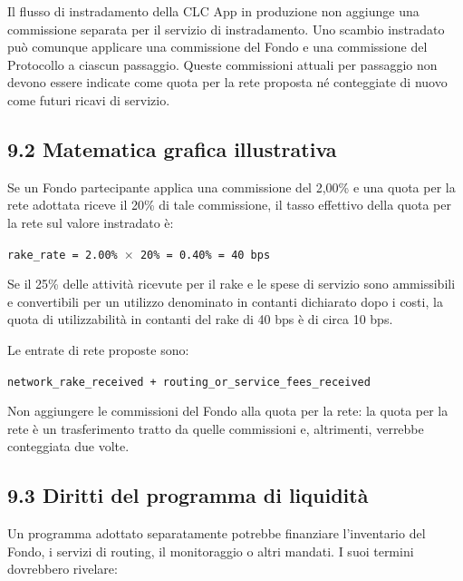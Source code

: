 \documentclass[11pt]{article}
\begin{document}
Il flusso di instradamento della CLC App in produzione non aggiunge una commissione separata per il servizio di instradamento. Uno scambio instradato può comunque applicare una commissione del Fondo e una commissione del Protocollo a ciascun passaggio. Queste commissioni attuali per passaggio non devono essere indicate come quota per la rete proposta né conteggiate di nuovo come futuri ricavi di servizio.

\subsection*{9.2 Matematica grafica illustrativa}

Se un Fondo partecipante applica una commissione del 2,00\% e una quota per la rete adottata riceve il 20\% di tale commissione, il tasso effettivo della quota per la rete sul valore instradato è:

\texttt{rake\_rate = 2.00\% $\times$ 20\% = 0.40\% = 40 bps}

Se il 25\% delle attività ricevute per il rake e le spese di servizio sono ammissibili e convertibili per un utilizzo denominato in contanti dichiarato dopo i costi, la quota di utilizzabilità in contanti del rake di 40 bps è di circa 10 bps.

Le entrate di rete proposte sono:

\texttt{network\_rake\_received + routing\_or\_service\_fees\_received}

Non aggiungere le commissioni del Fondo alla quota per la rete: la quota per la rete è un trasferimento tratto da quelle commissioni e, altrimenti, verrebbe conteggiata due volte.

\subsection*{9.3 Diritti del programma di liquidità}

Un programma adottato separatamente potrebbe finanziare l'inventario del Fondo, i servizi di routing, il monitoraggio o altri mandati. I suoi termini dovrebbero rivelare:
\end{document}
